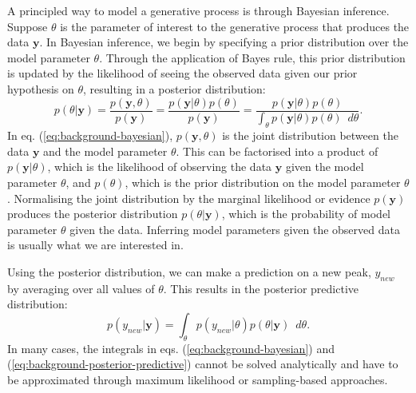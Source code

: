 A principled way to model a generative process is through Bayesian inference. Suppose $\theta$ is the parameter of interest to the generative process that produces the data $\mathbf{y}$. In Bayesian inference, we begin by specifying a prior distribution over the model parameter $\theta$. Through the application of Bayes rule, this prior distribution is updated by the likelihood of seeing the observed data given our prior hypothesis on $\theta$, resulting in a posterior distribution:
\begin{equation}
p(\theta \vert \mathbf{y})=\frac{p(\mathbf{y},\theta)}{p(\mathbf{y})}=\frac{p(\mathbf{y} \vert \theta)p(\theta)}{p(\mathbf{y})}=\frac{p(\mathbf{y} \vert \theta)p(\theta)}{\int_{\theta} p(\mathbf{y} \vert \theta)p(\theta) \enspace d\theta}.
\label{eq:background-bayesian}
\end{equation}
In eq. (\ref{eq:background-bayesian}), $p(\mathbf{y},\theta)$ is the joint distribution between the data $\mathbf{y}$ and the model parameter $\theta$. This can be factorised into a product of $p(\mathbf{y} \vert \theta)$, which is the likelihood of observing the data $\mathbf{y}$ given the model parameter $\theta$, and $p(\theta)$, which is the prior distribution on the model parameter $\theta$. Normalising the joint distribution by the marginal likelihood or evidence $p(\mathbf{y})$ produces the posterior distribution $p(\theta \vert \mathbf{y})$, which is the probability of model parameter $\theta$ given the data. Inferring model parameters given the observed data is usually what we are interested in.

Using the posterior distribution, we can make a prediction on a new peak, $y_{new}$ by averaging over all values of $\theta$. This results in the posterior predictive distribution:
\begin{equation}
p(y_{new} \vert \mathbf{y})=\int_{\theta} p(y_{new} \vert \theta) p(\theta \vert \mathbf{y}) \enspace d\theta.
\label{eq:background-posterior-predictive}
\end{equation}
In many cases, the integrals in eqs. (\ref{eq:background-bayesian}) and (\ref{eq:background-posterior-predictive}) cannot be solved analytically and have to be approximated through maximum likelihood or sampling-based approaches.

